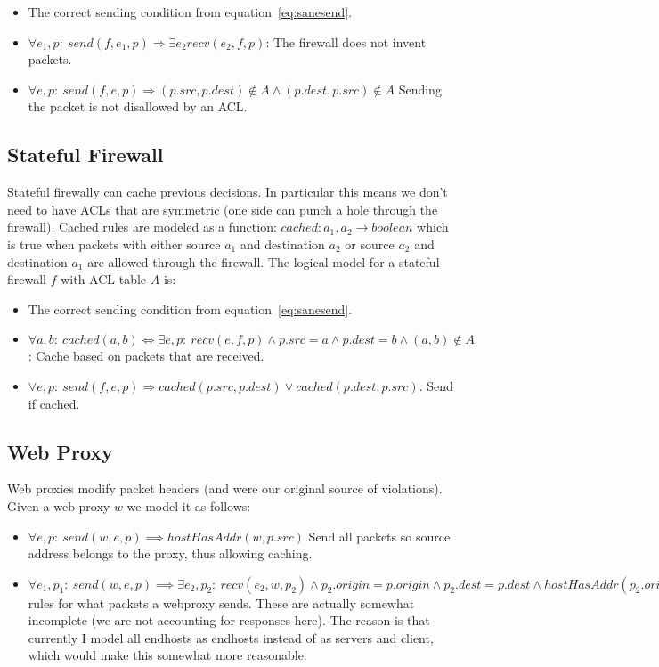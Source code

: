 \begin{itemize}
\item The correct sending condition from equation~\ref{eq:sanesend}.
\item $\forall e_1, p:\ send(f, e_1, p) \Rightarrow \exists e_2 recv(e_2, f, p)$: The firewall does not invent packets.
\item $\forall e, p:\ send(f, e, p) \Rightarrow (p.src, p.dest) \not \in A \land (p.dest, p.src) \not \in A$ Sending the packet is not disallowed by an
ACL.
\end{itemize}

\subsection{Stateful Firewall}
Stateful firewally can cache previous decisions. In particular this means we don't need to have ACLs that are symmetric
(one side can punch a hole through the firewall). Cached rules are modeled as a function: $cached: a_1, a_2 \rightarrow
boolean$ which is true when packets with either source $a_1$ and destination $a_2$ or source $a_2$ and destination $a_1$
are allowed through the firewall. The logical model for a stateful firewall $f$ with ACL table $A$ is:

\begin{itemize}
\item The correct sending condition from equation~\ref{eq:sanesend}.
\item $\forall a, b:\ cached(a, b) \iff \exists e, p:\ recv(e, f, p) \land p.src = a \land p.dest = b\land (a, b) \not
\in A$: Cache based on packets that are received.
\item $\forall e, p:\ send(f, e, p) \Rightarrow cached(p.src, p.dest) \lor cached(p.dest, p.src)$. Send if cached.
\end{itemize}

\subsection{Web Proxy}
Web proxies modify packet headers (and were our original source of violations). Given a web proxy $w$ we model it as
follows:
\begin{itemize}
\item $\forall e, p:\ send(w, e, p) \implies hostHasAddr(w, p.src)$ Send all packets so source address belongs to the
proxy, thus allowing caching.
\item $\forall e_1, p_1:\ send(w, e, p) \implies \exists e_2, p_2:\ recv(e_2, w, p_2) \land p_2.origin = p.origin \land
p_2.dest = p.dest \land hostHasAddr(p_2.origin, p_2.src)$ rules for what packets a webproxy sends. These are actually
somewhat incomplete (we are not accounting for responses here). The reason is that currently I model all endhosts as
endhosts instead of as servers and client, which would make this somewhat more reasonable.
\end{itemize}
